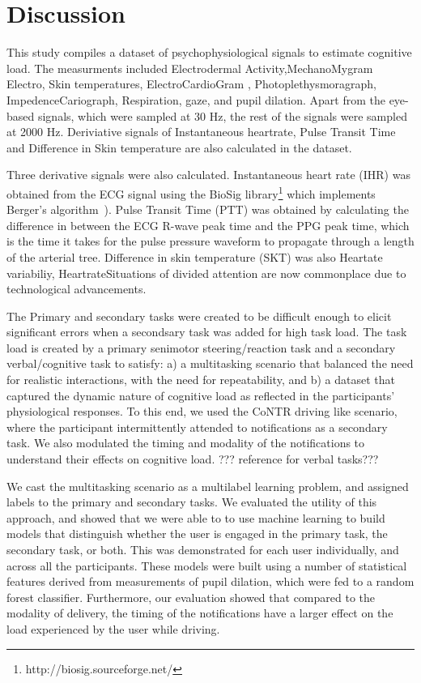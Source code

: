 \section{Discussion}
This study compiles a dataset of psychophysiological signals to estimate cognitive load.  The measurments included  Electrodermal Activity,MechanoMygram Electro, Skin temperatures, ElectroCardioGram , Photoplethysmoragraph, ImpedenceCariograph,  Respiration, gaze, and pupil dilation. Apart from the eye-based signals, which were sampled at 30 Hz, the rest of the signals were sampled at 2000 Hz. 
Deriviative signals of Instantaneous heartrate, Pulse Transit Time and Difference in Skin temperature are also calculated in the dataset. 

Three derivative signals were also calculated. Instantaneous heart rate (IHR) was obtained from the ECG signal using the BioSig library\footnote{http://biosig.sourceforge.net/} which implements Berger's algorithm~\cite{berger1986}). Pulse Transit Time (PTT) was obtained by calculating the difference in between the ECG R-wave peak time and the PPG peak time, which is the time it takes for the pulse pressure waveform to propagate through a length of the arterial tree. Difference in skin temperature (SKT) was also Heartate variabiliy, HeartrateSituations of divided attention are now commonplace due to technological advancements. 

The Primary and secondary tasks were created to be difficult enough to elicit significant errors when a secondsary task was added for high task load.  The task load is created by a primary senimotor steering/reaction task and a secondary verbal/cognitive task to satisfy: a) a multitasking scenario that balanced the need for realistic interactions, with the need for repeatability, and b) a dataset that captured the dynamic nature of cognitive load as reflected in the participants' physiological responses. To this end, we used the CoNTR driving like scenario, where the participant intermittently attended to notifications as a secondary task. We also modulated the timing and modality of the notifications to understand their effects on cognitive load. ??? reference for verbal tasks???

We cast the multitasking scenario as a multilabel learning problem, and assigned labels to the primary and secondary tasks. We evaluated the utility of this approach, and showed that we were able to to use machine learning to build models that distinguish whether the user is engaged in the primary task, the secondary task, or both. This was demonstrated for each user individually, and across all the participants. These models were built using a number of statistical features derived from measurements of pupil dilation, which were fed to a random forest classifier. Furthermore, our evaluation showed that compared to the modality of delivery, the timing of the notifications have a larger effect on the load experienced by the user while driving. 

